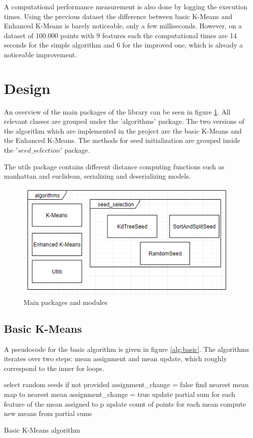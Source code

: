 \documentclass[12pt]{article}
\begin{document}
	A computational performance measurement is also done by logging the execution times. Using the previous dataset the difference between basic K-Means and Enhanced K-Means is barely noticeable, only a few milliseconds. However, on a dataset of 100.000 points with 9 features each the computational times are 14 seconds for the simple algorithm and 6 for the improved one, which is already a noticeable improvement.
	
	\section{Design}
	An overview of the main packages of the library can be seen in figure \ref{fig:packages}. All relevant classes are grouped under the 'algorithms' package. The two versions of the algorithm which are implemented in the project are the basic K-Means and the Enhanced K-Means. The methods for seed initialization are grouped inside the $'seed\_selection'$ package.
	
	The utils package contains different distance computing functions such as manhattan and euclidean, serializing and deserializing models.
	
	\begin{figure}[h]
		\centering
		\includegraphics{resources/Packages.png}
		\caption{Main packages and modules}
		\label{fig:packages}
	\end{figure}

	\subsection{Basic K-Means}
	A pseudocode for the basic algorithm is given in figure \ref{alg:basic}. The algorithms iterates over two steps: mean assignment and mean update, which roughly correspond to the inner for loops.
	
	\begin{algorithm}[h]
		select random seeds if not provided\;
		{
			assignment\_change = false\;
			{
				find nearest mean\;
				map to nearest mean\;
				{
					assignment\_change = true\;
				}
			}
		    {
		    	update partial sum for each feature
		    	of the mean assigned to p\;
		    	update count of points for each mean\;
		    }
	    	compute new means from partial sums\;
		}
		\caption{Basic K-Means algorithm}
		\label{alg:basic}
	\end{algorithm}
\end{document}
